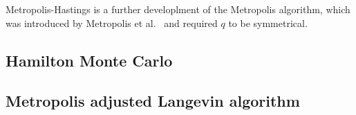 Metropolis-Hastings is a further developlment of the Metropolis algorithm, which was introduced by Metropolis et al.~\cite{metropolis1953} and required $q$ to be symmetrical.

\subsection{Hamilton Monte Carlo}

\subsection{Metropolis adjusted Langevin algorithm}

